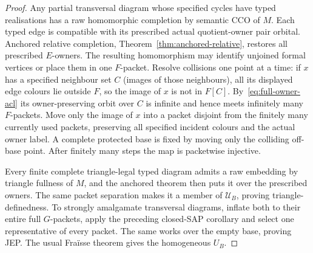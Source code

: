\begin{proof}
Any partial transversal diagram whose specified cycles
have typed realisations has a raw homomorphic completion
by semantic CCO of $M$.  Each typed edge is compatible
with its prescribed actual quotient-owner pair orbital.
Anchored relative completion,
Theorem~\ref{thm:anchored-relative}, restores all prescribed
$E$-owners.  The resulting homomorphism may identify
unjoined formal vertices or place them in one $F$-packet.
Resolve collisions one point at a time: if $x$ has a
specified neighbour set $C$ (images of those neighbours),
all its displayed edge colours lie outside $F$, so the
image of $x$ is not in $F[C]$.  By~\eqref{eq:full-owner-acl}
its owner-preserving orbit over $C$ is infinite and hence
meets infinitely many $F$-packets.  Move only the image
of $x$ into a packet disjoint from the finitely many
currently used packets, preserving all specified incident
colours and the actual owner label.  A complete protected
base is fixed by moving only the colliding off-base point.
After finitely many steps the map is packetwise injective.

Every finite complete triangle-legal typed diagram admits
a raw embedding by triangle fullness of $M$, and the
anchored theorem then puts it over the prescribed owners.
The same packet separation makes it a member of
$\mathcal U_B$, proving triangle-definedness.  To strongly
amalgamate transversal diagrams, inflate both to their
entire full $G$-packets, apply the preceding closed-SAP
corollary and select one representative of every packet.
The same works over the empty base, proving JEP.
The usual Fra\"isse theorem gives the homogeneous $U_B$.


\end{proof}
